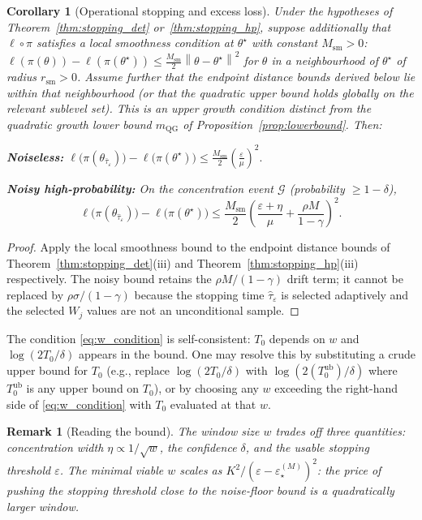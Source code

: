 \documentclass[12pt,a4paper]{article}
\newtheorem{remark}[definition]{Remark}
\newtheorem{corollary}[definition]{Corollary}
\newcommand{\norm}[1]{\left\lVert#1\right\rVert}
\begin{document}
\begin{corollary}[Operational stopping and excess loss]
\label{cor:op_stopping}
Under the hypotheses of Theorem~\ref{thm:stopping_det}
or~\ref{thm:stopping_hp}, suppose additionally that $\ell \circ \pi$ satisfies
a \emph{local smoothness} condition at $\theta^\star$ with constant
$M_{\mathrm{sm}} > 0$:
$\ell(\pi(\theta)) - \ell(\pi(\theta^\star)) \leq \tfrac{M_{\mathrm{sm}}}{2}
\norm{\theta - \theta^\star}^2$ for $\theta$ in a neighbourhood of
$\theta^\star$ of radius $r_{\mathrm{sm}} > 0$. Assume further that the
endpoint distance bounds derived below lie within that neighbourhood (or that the
quadratic upper bound holds globally on the relevant sublevel set).
This is an \emph{upper} growth condition distinct from the quadratic growth
lower bound $m_{\mathrm{QG}}$ of Proposition~\ref{prop:lowerbound}.
Then:

\textbf{Noiseless:}
$\displaystyle
\ell\bigl(\pi(\theta_{\bar\tau_\varepsilon})\bigr)
- \ell\bigl(\pi(\theta^\star)\bigr)
\leq \frac{M_{\mathrm{sm}}}{2} \left(\frac{\varepsilon}{\mu}\right)^2.$

\textbf{Noisy high-probability:} On the concentration event $\mathcal{G}$ (probability $\geq 1-\delta$),
\[
\ell\bigl(\pi(\theta_{\hat\tau_\varepsilon})\bigr)
- \ell\bigl(\pi(\theta^\star)\bigr)
\leq \frac{M_{\mathrm{sm}}}{2}
\left(\frac{\varepsilon + \eta}{\mu} + \frac{\rho M}{1 - \gamma}\right)^2.
\]
\end{corollary}

\begin{proof}
Apply the local smoothness bound to the endpoint distance bounds of
Theorem~\ref{thm:stopping_det}(iii) and Theorem~\ref{thm:stopping_hp}(iii)
respectively. The noisy bound retains the $\rho M/(1-\gamma)$ drift term; it
cannot be replaced by $\rho\sigma/(1-\gamma)$ because the stopping time
$\hat\tau_\varepsilon$ is selected adaptively and the selected $W_j$ values
are not an unconditional sample. \qedhere
\end{proof}

The condition \eqref{eq:w_condition} is self-consistent: $T_0$ depends on
$w$ and $\log(2T_0/\delta)$ appears in the bound. One may resolve this by
substituting a crude upper bound for $T_0$ (e.g., replace $\log(2T_0/\delta)$
with $\log(2(T_0^{\mathrm{ub}})/\delta)$ where $T_0^{\mathrm{ub}}$ is any
upper bound on $T_0$), or by choosing any $w$ exceeding the right-hand side
of \eqref{eq:w_condition} with $T_0$ evaluated at that $w$.

\begin{remark}[Reading the bound]
\label{rem:hp_reading}
The window size $w$ trades off three quantities: concentration width
$\eta \propto 1/\sqrt{w}$, the confidence $\delta$, and the usable stopping
threshold $\varepsilon$. The minimal viable $w$ scales as
$K^2/(\varepsilon - \varepsilon_\star^{(M)})^2$: the price of pushing the
stopping threshold close to the noise-floor bound is a quadratically larger
window.
\end{remark}
\end{document}
